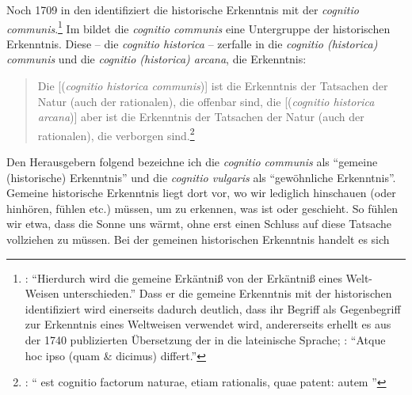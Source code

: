 Noch 1709 in den 
identifiziert  die historische
Erkenntnis mit der \emph{cognitio
communis}.\footnote{\cite[Vgl.][\S~6]{Wolff:VernuenftigeGedankenvondenKraeftendesmenschlichenVerstandesundihremrichtigenGebraucheinErkenntnisderWahrheit1978}:
\enquote{Hierdurch wird die gemeine Erkäntniß von der Erkäntniß eines
Welt-Weisen unterschieden.} Dass er die gemeine Erkenntnis mit der historischen
identifiziert wird einerseits dadurch deutlich, dass ihr Begriff als
Gegenbegriff zur Erkenntnis eines Weltweisen verwendet wird, andererseits
erhellt es aus der 1740 publizierten Übersetzung der 
in die lateinische Sprache; \cite[vgl.][\S~6]{Wolff:Cogitationesrationalesdeviribusintellectushumani1983}:
\enquote{Atque hoc ipso  (quam {\&}  dicimus) differt.}}
Im  bildet die \emph{cognitio communis} eine Untergruppe
der historischen Erkenntnis. Diese -- die \emph{cognitio historica} --
zerfalle in die \emph{cognitio (historica) communis} und die
\emph{cognitio (historica) arcana}, die  Erkenntnis:
\begin{quote}
  Die  [(\emph{cognitio historica
  communis})] ist die Erkenntnis der Tatsachen der Natur (auch der rationalen), die offenbar sind, die  [(\emph{cognitio historica arcana})] aber ist die
  Erkenntnis der Tatsachen der Natur (auch der rationalen), die verborgen
  sind.\footnote{\Cite[][\S~21]{Wolff:Discursuspraeliminarisdephilosophiaingenere1996}:
  \enquote{ est cognitio factorum naturae,
  etiam rationalis, quae patent:  autem }}
\end{quote}
Den Herausgebern  folgend bezeichne ich
die \emph{cognitio communis} als \enquote{gemeine (historische) Erkenntnis} und die
\emph{cognitio vulgaris} als \enquote{gewöhnliche Erkenntnis}. Gemeine
historische Erkenntnis liegt dort vor, wo wir lediglich hinschauen (oder
hinhören, fühlen etc.) müssen, um zu erkennen, was ist oder geschieht. So fühlen
wir etwa, dass die Sonne uns wärmt, ohne erst einen Schluss auf diese Tatsache
vollziehen zu müssen. Bei der gemeinen historischen Erkenntnis handelt es sich
